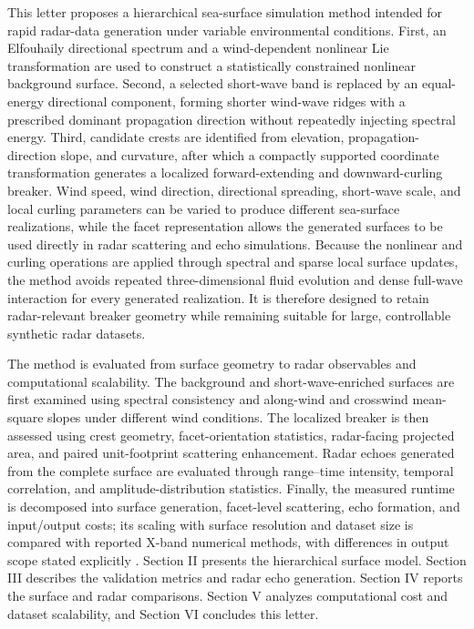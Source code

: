 This letter proposes a hierarchical sea-surface simulation method intended for rapid radar-data generation under variable environmental conditions. First, an Elfouhaily directional spectrum and a wind-dependent nonlinear Lie transformation are used to construct a statistically constrained nonlinear background surface. Second, a selected short-wave band is replaced by an equal-energy directional component, forming shorter wind-wave ridges with a prescribed dominant propagation direction without repeatedly injecting spectral energy. Third, candidate crests are identified from elevation, propagation-direction slope, and curvature, after which a compactly supported coordinate transformation generates a localized forward-extending and downward-curling breaker. Wind speed, wind direction, directional spreading, short-wave scale, and local curling parameters can be varied to produce different sea-surface realizations, while the facet representation allows the generated surfaces to be used directly in radar scattering and echo simulations. Because the nonlinear and curling operations are applied through spectral and sparse local surface updates, the method avoids repeated three-dimensional fluid evolution and dense full-wave interaction for every generated realization. It is therefore designed to retain radar-relevant breaker geometry while remaining suitable for large, controllable synthetic radar datasets.

The method is evaluated from surface geometry to radar observables and computational scalability. The background and short-wave-enriched surfaces are first examined using spectral consistency and along-wind and crosswind mean-square slopes under different wind conditions. The localized breaker is then assessed using crest geometry, facet-orientation statistics, radar-facing projected area, and paired unit-footprint scattering enhancement. Radar echoes generated from the complete surface are evaluated through range--time intensity, temporal correlation, and amplitude-distribution statistics. Finally, the measured runtime is decomposed into surface generation, facet-level scattering, echo formation, and input/output costs; its scaling with surface resolution and dataset size is compared with reported X-band numerical methods, with differences in output scope stated explicitly \cite{li2019fpfsm,liu2026parallel,zhang2024gpu}. Section II presents the hierarchical surface model. Section III describes the validation metrics and radar echo generation. Section IV reports the surface and radar comparisons. Section V analyzes computational cost and dataset scalability, and Section VI concludes this letter.
